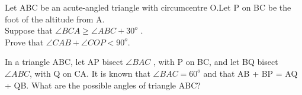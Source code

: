 \item Let ABC be an acute-angled triangle with circumcentre O.Let P on BC be the foot of the altitude from A.\\
Suppose that $\angle BCA \geq  \angle ABC +  30^o$ .\\
Prove that $\angle CAB + \angle COP < 90^o$.\\

\item In a triangle ABC, let AP bisect $\angle BAC$ , with P on BC, and let BQ bisect $\angle ABC$, with Q on CA. It is known that $\angle BAC = 60^o$ and that AB + BP = AQ + QB. What are the possible angles of triangle ABC?

